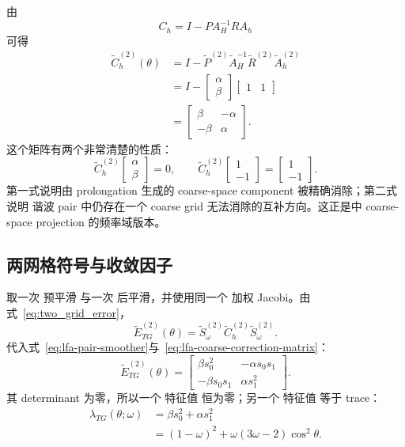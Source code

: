 由
\begin{equation}
C_h=I-PA_H^{-1}RA_h
\end{equation}
可得
\begin{align}
\widetilde C_h^{(2)}(\theta)
&=I-
\widetilde P^{(2)}
\widetilde A_H^{-1}
\widetilde R^{(2)}
\widetilde A_h^{(2)}\\
&=I-
\begin{bmatrix}\alpha\\\beta\end{bmatrix}
\begin{bmatrix}1&1\end{bmatrix}\\
&=
\boxed{
\begin{bmatrix}
\beta&-\alpha\\
-\beta&\alpha
\end{bmatrix}.}
\label{eq:lfa-coarse-correction-matrix}
\end{align}
这个矩阵有两个非常清楚的性质：
\begin{equation}
\widetilde C_h^{(2)}
\begin{bmatrix}\alpha\\\beta\end{bmatrix}=0,
\qquad
\widetilde C_h^{(2)}
\begin{bmatrix}1\\-1\end{bmatrix}
=\begin{bmatrix}1\\-1\end{bmatrix}.
\label{eq:lfa-coarse-correction-eigenvectors}
\end{equation}
第一式说明由 prolongation 生成的 coarse-space component 被精确消除；第二式说明 谐波 pair 中仍存在一个 coarse grid 无法消除的互补方向。这正是中 coarse-space projection 的频率域版本。

\subsection{两网格符号与收敛因子}

取一次 预平滑 与一次 后平滑，并使用同一个 加权 Jacobi。由式~\eqref{eq:two_grid_error}，
\begin{equation}
\widetilde E_{TG}^{(2)}(\theta)
=
\widetilde S_\omega^{(2)}
\widetilde C_h^{(2)}
\widetilde S_\omega^{(2)}.
\end{equation}
代入式~\eqref{eq:lfa-pair-smoother}与~\eqref{eq:lfa-coarse-correction-matrix}：
\begin{equation}
\boxed{
\widetilde E_{TG}^{(2)}(\theta)
=
\begin{bmatrix}
\beta s_0^2&-\alpha s_0s_1\\
-\beta s_0s_1&\alpha s_1^2
\end{bmatrix}.}
\label{eq:lfa-two-grid-matrix-1d}
\end{equation}
其 determinant 为零，所以一个 特征值 恒为零；另一个 特征值 等于 trace：
\begin{align}
\lambda_{TG}(\theta;\omega)
&=\beta s_0^2+\alpha s_1^2\\
&=(1-\omega)^2
+\omega(3\omega-2)\cos^2\theta.
\label{eq:lfa-two-grid-nonzero-eigenvalue}
\end{align}

